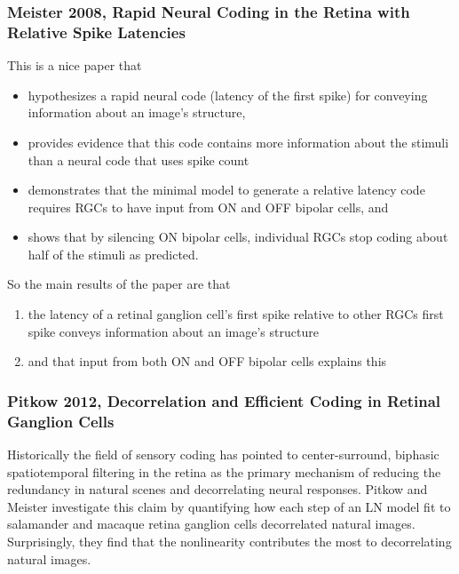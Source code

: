 \documentclass{article}
\begin{document}
\subsubsection{Meister 2008, Rapid Neural Coding in the Retina with Relative Spike Latencies}
This is a nice paper that 
\begin{itemize}
\item hypothesizes a rapid neural code (latency of the first spike) for conveying information about an image's structure,
\item provides evidence that this code contains more information about the stimuli than a neural code that uses spike count
\item demonstrates that the minimal model to generate a relative latency code requires RGCs to have input from ON and OFF bipolar cells, and
\item shows that by silencing ON bipolar cells, individual RGCs stop coding about half of the stimuli as predicted.
\end{itemize}
So the main results of the paper are that
\begin{enumerate}
\item the latency of a retinal ganglion cell's first spike relative to other RGCs first spike conveys information about an image's structure
\item and that input from both ON and OFF bipolar cells explains this
\end{enumerate}

\subsubsection{Pitkow 2012, Decorrelation and Efficient Coding in Retinal Ganglion Cells}
Historically the field of sensory coding has pointed to center-surround, biphasic spatiotemporal filtering in the retina as the primary mechanism of reducing the redundancy in natural scenes and decorrelating neural responses.  Pitkow and Meister investigate this claim by quantifying how each step of an LN model fit to salamander and macaque retina ganglion cells decorrelated natural images.  Surprisingly, they find that the nonlinearity contributes the most to decorrelating natural images. 
\end{document}
